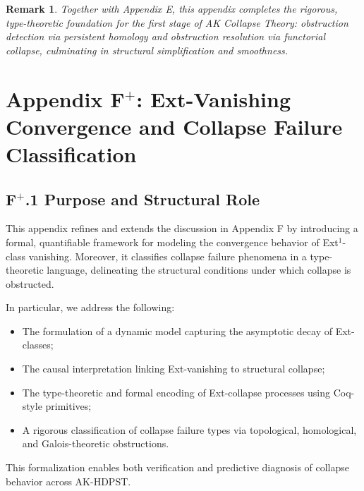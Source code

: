 \documentclass[11pt]{article}
\newtheorem{remark}[theorem]{Remark}
\begin{document}
\begin{remark}
Together with Appendix E, this appendix completes the rigorous, type-theoretic foundation for the first stage of AK Collapse Theory: obstruction detection via persistent homology and obstruction resolution via functorial collapse, culminating in structural simplification and smoothness.
\end{remark}




\section*{Appendix F$^{+}$: Ext-Vanishing Convergence and Collapse Failure Classification}

\subsection*{F$^{+}$.1 Purpose and Structural Role}

This appendix refines and extends the discussion in Appendix F by introducing a formal, quantifiable framework for modeling the convergence behavior of Ext$^1$-class vanishing. Moreover, it classifies collapse failure phenomena in a type-theoretic language, delineating the structural conditions under which collapse is obstructed.

In particular, we address the following:

\begin{itemize}
    \item The formulation of a dynamic model capturing the asymptotic decay of Ext-classes;
    \item The causal interpretation linking Ext-vanishing to structural collapse;
    \item The type-theoretic and formal encoding of Ext-collapse processes using Coq-style primitives;
    \item A rigorous classification of collapse failure types via topological, homological, and Galois-theoretic obstructions.
\end{itemize}

This formalization enables both verification and predictive diagnosis of collapse behavior across AK-HDPST.
\end{document}
